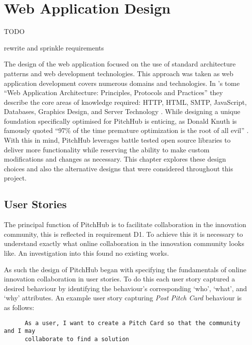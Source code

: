 
\chapter{Web Application Design}\label{C:design_web}

TODO

rewrite and sprinkle requirements

The design of the web application focused on the use of standard architecture patterns and web development technologies. This approach was taken as web application development covers numerous domains and technologies. In \citeauthor{shklar2009web}'s tome ``Web Application Architecture: Principles, Protocols and Practices'' they describe the core areas of knowledge required: HTTP, HTML, SMTP, JavaScript, Databases, Graphics Design, and Server Technology \cite{shklar2009web}. While designing a unique foundation specifically optimised for PitchHub is enticing, as Donald Knuth is famously quoted ``97\% of the time premature optimization is the root of all evil'' \cite{knuth1974structured}. With this in mind, PitchHub leverages battle tested open source libraries to deliver more functionality while reserving the ability to make custom modifications and changes as necessary. This chapter explores these design choices and also the alternative designs that were considered throughout this project.

\section{User Stories}

The principal function of PitchHub is to facilitate collaboration in the innovation community, this is reflected in requirement D1. To achieve this it is necessary to understand exactly what online collaboration in the innovation community looks like. An investigation into this found no existing works. 

As such the design of PitchHub began with specifying the fundamentals of online innovation collaboration in user stories. To do this each user story captured a desired behaviour by identifying the behaviour's corresponding `who', `what', and `why' attributes. An example user story capturing \textit{Post Pitch Card} behaviour is as follows:

\begin{verbatim}
	  As a user, I want to create a Pitch Card so that the community and I may 
	  collaborate to find a solution	
\end{verbatim}

